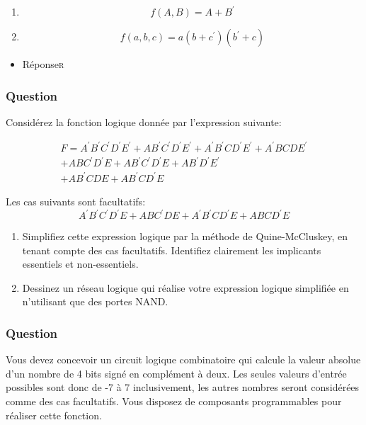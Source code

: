 \documentclass[11pt]{article}
\begin{document}
\begin{enumerate}
\item $$f(A, B) = A + B^{\prime}$$

\item $$f(a, b, c) = a(b+c^{\prime})(b^{\prime}+c)$$
\end{enumerate}

\begin{itemize}
\item Réponse\hfill{}\textsc{r}
\label{sec:org03c63b0}
\end{itemize}

\subsubsection*{Question}
\label{sec:org62ed0e2}
Considérez la fonction logique donnée par l'expression suivante:

\begin{multline*}
F = A^{\prime} B^{\prime} C^{\prime} D^{\prime} E^{\prime} + {A} B^{\prime} C^{\prime} D^{\prime} E^{\prime} + A^{\prime} B^{\prime} {C} D^{\prime} E^{\prime} + A^{\prime} {B} {C} {D} E^{\prime} \\ + {A} {B} C^{\prime} D^{\prime} {E} + {A} B^{\prime} C^{\prime} D^{\prime} {E} + {A} B^{\prime} D^{\prime} E^{\prime} \\ + {A} B^{\prime} {C} {D} {E} + {A} B^{\prime}  {C} D^{\prime} {E}
\end{multline*}

Les cas suivants sont facultatifs:
\begin{displaymath}
A^{\prime} B^{\prime} C^{\prime} D^{\prime} {E} + {A} {B} C^{\prime} {D} {E} +  A^{\prime}B^{\prime} {C} D^{\prime} {E} + {A} {B} {C} D^{\prime} {E}
\end{displaymath}

\begin{enumerate}
\item Simplifiez cette expression logique par la méthode de
Quine-McCluskey, en tenant compte des cas facultatifs. Identifiez
clairement les implicants essentiels et non-essentiels.

\item Dessinez un réseau logique qui réalise votre expression logique
simplifiée en n'utilisant que des portes NAND.
\end{enumerate}

\subsubsection*{Question}
\label{sec:orge8f1f27}
Vous devez concevoir un circuit logique combinatoire qui calcule la
valeur absolue d'un nombre de 4 bits signé en complément à deux. Les
seules valeurs d'entrée possibles sont donc de -7 à 7 inclusivement,
les autres nombres seront considérées comme des cas facultatifs. Vous
disposez de composants programmables pour réaliser cette fonction.
\end{document}
